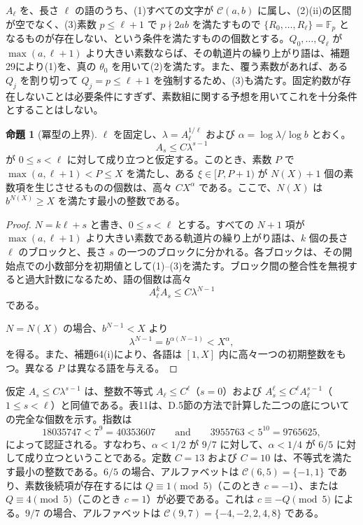 \documentclass[11pt,reqno]{amsart}
\theoremstyle{definition}
\newtheorem{proposition}[theorem]{命題}
\theoremstyle{definition}
\theoremstyle{remark}
\begin{document}
\(A_\ell\) を、長さ \(\ell\) の語のうち、(1)すべての文字が \(\mathcal C(a,b)\) に属し、(2)(ii)の区間が空でなく、(3)素数 \(p\le\ell+1\) で \(p\nmid2ab\) を満たすもので \(\{R_0,\ldots,R_\ell\}=\mathbb F_p\) となるものが存在しない、という条件を満たすものの個数とする。\(Q_0,\ldots,Q_\ell\) が \(\max(a,\ell+1)\) より大きい素数ならば、その軌道片の繰り上がり語は、補題29により(1)を、真の \(\theta_0\) を用いて(2)を満たす。また、覆う素数があれば、ある \(Q_j\) を割り切って \(Q_j=p\le\ell+1\) を強制するため、(3)も満たす。固定約数が存在しないことは必要条件にすぎず、素数組に関する予想を用いてこれを十分条件とすることはしない。

\begin{samepage}
\begin{proposition}[冪型の上界]\leavevmode\label{thm:65}
\(\ell\) を固定し、\(\lambda=A_\ell^{1/\ell}\) および \(\alpha=\log\lambda/\log b\) とおく。
\[
A_s\le C\lambda^{s-1}
\]
が \(0\le s<\ell\) に対して成り立つと仮定する。このとき、素数 \(P\) で \(\max(a,\ell+1)<P\le X\) を満たし、ある \(\xi\in[P,P+1)\) が \(N(X)+1\) 個の素数項を生じさせるものの個数は、高々 \(CX^\alpha\) である。ここで、\(N(X)\) は \(b^{N(X)}\ge X\) を満たす最小の整数である。
\label{thm-end:65}
\end{proposition}
\end{samepage}

\begin{proof}\leavevmode\label{proof:65}
\(N=k\ell+s\) と書き、\(0\le s<\ell\) とする。すべての \(N+1\) 項が \(\max(a,\ell+1)\) より大きい素数である軌道片の繰り上がり語は、\(k\) 個の長さ \(\ell\) のブロックと、長さ \(s\) の一つのブロックに分かれる。各ブロックは、その開始点での小数部分を初期値として(1)--(3)を満たす。ブロック間の整合性を無視すると過大計数になるため、語の個数は高々
\[
A_\ell^kA_s\le
C\lambda^{N-1}
\]
である。

\(N=N(X)\) の場合、\(b^{N-1}<X\) より
\[
\lambda^{N-1}=b^{\alpha(N-1)}<X^\alpha,
\]
を得る。また、補題64(i)により、各語は \([1,X]\) 内に高々一つの初期整数をもつ。異なる \(P\) は異なる語を与える。\qedhere
\end{proof}

仮定 \(A_s\le C\lambda^{s-1}\) は、整数不等式 \(A_\ell\le C^\ell\)（\(s=0\)）および \(A_s^{\ell}\le C^{\ell}A_\ell^{s-1}\)（\(1\le s<\ell\)）と同値である。表11は、D.5節の方法で計算した二つの底についての完全な個数を示す。指数は
\[
18035747<7^9=40353607\qquad \text{and}\qquad 3955763<5^{10}=9765625,
\]
によって認証される。すなわち、\(\alpha<1/2\) が \(9/7\) に対して、\(\alpha<1/4\) が \(6/5\) に対して成り立つということである。定数 \(C=13\) および \(C=10\) は、不等式を満たす最小の整数である。\(6/5\) の場合、アルファベットは \(\mathcal C(6,5)=\{-1,1\}\) であり、素数後続項が存在するには \(Q\equiv1\pmod5\)（このとき \(c=-1\)）、または \(Q\equiv4\pmod5\)（このとき \(c=1\)）が必要である。これは \(c\equiv-Q\pmod5\) による。\(9/7\) の場合、アルファベットは \(\mathcal C(9,7)=\{-4,-2,2,4,8\}\) である。
\end{document}
